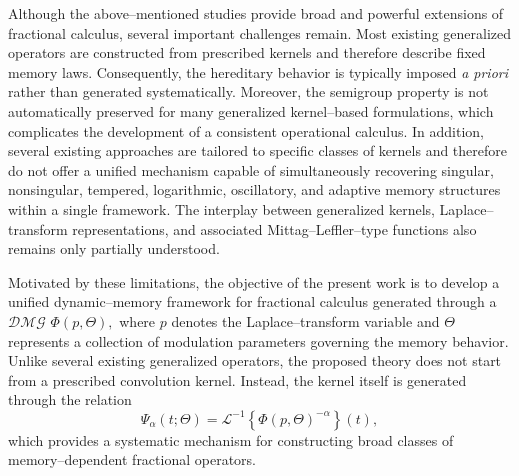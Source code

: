 \documentclass[11pt]{article}
\numberwithin{equation}{section}
\begin{document}
Although the above--mentioned studies provide broad and powerful extensions of fractional calculus, several important challenges remain. Most existing generalized operators are constructed from prescribed kernels and therefore describe fixed memory laws. Consequently, the hereditary behavior is typically imposed \textit{a priori} rather than generated systematically. Moreover, the semigroup property is not automatically preserved for many generalized kernel--based formulations, which complicates the development of a consistent operational calculus. In addition, several existing approaches are tailored to specific classes of kernels and therefore do not offer a unified mechanism capable of simultaneously recovering singular, nonsingular, tempered, logarithmic, oscillatory, and adaptive memory structures within a single framework. The interplay between generalized kernels, Laplace--transform representations, and associated Mittag--Leffler--type functions also remains only partially understood.


Motivated by these limitations, the objective of the present work is to develop a unified dynamic--memory framework for fractional calculus generated through a $\mathcal{DMG}$
\(
\Phi(p,\Theta),
\)
where $p$ denotes the Laplace--transform variable and $\Theta$ represents a collection of modulation parameters governing the memory behavior. Unlike several existing generalized operators, the proposed theory does not start from a prescribed convolution kernel. Instead, the kernel itself is generated through the relation
\[
\Psi_\alpha(t;\Theta)
=
\mathcal L^{-1}
\left\{
\Phi(p,\Theta)^{-\alpha}
\right\}(t),
\]
which provides a systematic mechanism for constructing broad classes of memory--dependent fractional operators.
\end{document}
